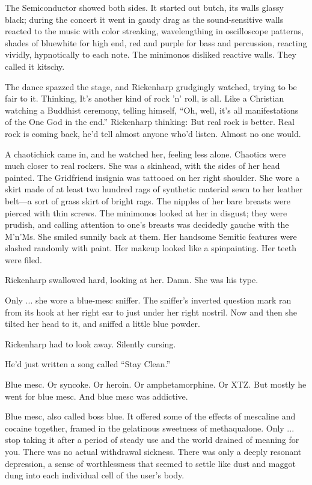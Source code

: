 The Semiconductor showed both sides. It started out butch, its walls glassy black; during the concert it went in gaudy drag as the sound-sensitive walls reacted to the music with color streaking, wavelengthing in oscilloscope patterns, shades of bluewhite for high end, red and purple for bass and percussion, reacting vividly, hypnotically to each note. The minimonos disliked reactive walls. They called it kitschy.

The dance spazzed the stage, and Rickenharp grudgingly watched, trying to be fair to it. Thinking, It's another kind of rock 'n' roll, is all. Like a Christian watching a Buddhist ceremony, telling himself, ``Oh, well, it's all manifestations of the One God in the end.'' Rickenharp thinking: But real rock is better. Real rock is coming back, he'd tell almost anyone who'd listen. Almost no one would.

A chaotichick came in, and he watched her, feeling less alone. Chaotics were much closer to real rockers. She was a skinhead, with the sides of her head painted. The Gridfriend insignia was tattooed on her right shoulder. She wore a skirt made of at least two hundred rags of synthetic material sewn to her leather belt—a sort of grass skirt of bright rags. The nipples of her bare breasts were pierced with thin screws. The minimonos looked at her in disgust; they were prudish, and calling attention to one's breasts was decidedly gauche with the M'n'Ms. She smiled sunnily back at them. Her handsome Semitic features were slashed randomly with paint. Her makeup looked like a spinpainting. Her teeth were filed.

Rickenharp swallowed hard, looking at her. Damn. She was his type.

Only ... she wore a blue-mesc sniffer. The sniffer's inverted question mark ran from its hook at her right ear to just under her right nostril. Now and then she tilted her head to it, and sniffed a little blue powder.

Rickenharp had to look away. Silently cursing.

He'd just written a song called ``Stay Clean.''

Blue mesc. Or syncoke. Or heroin. Or amphetamorphine. Or XTZ. But mostly he went for blue mesc. And blue mesc was addictive.

Blue mesc, also called boss blue. It offered some of the effects of mescaline and cocaine together, framed in the gelatinous sweetness of methaqualone. Only ... stop taking it after a period of steady use and the world drained of meaning for you. There was no actual withdrawal sickness. There was only a deeply resonant depression, a sense of worthlessness that seemed to settle like dust and maggot dung into each individual cell of the user's body.

